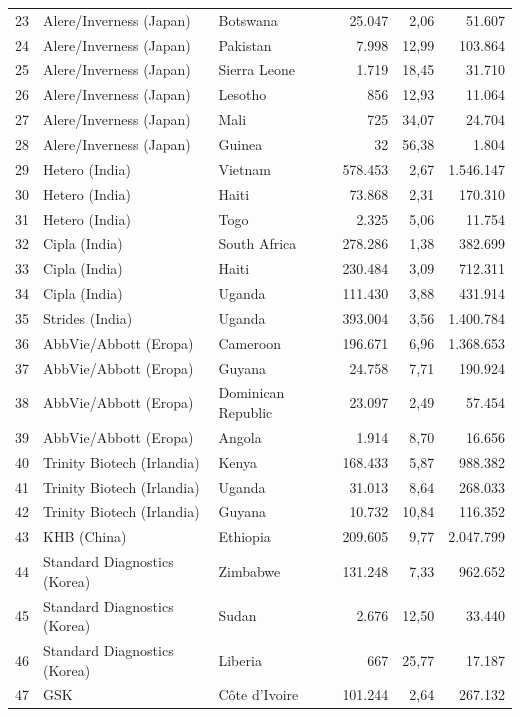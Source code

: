 \begin{longtable}{rllrrr}
23 & Alere/Inverness (Japan) & Botswana & 25.047 & 2,06 & 51.607 \\
24 & Alere/Inverness (Japan) & Pakistan & 7.998 & 12,99 & 103.864 \\
25 & Alere/Inverness (Japan) & Sierra Leone & 1.719 & 18,45 & 31.710 \\
26 & Alere/Inverness (Japan) & Lesotho & 856 & 12,93 & 11.064 \\
27 & Alere/Inverness (Japan) & Mali & 725 & 34,07 & 24.704 \\
28 & Alere/Inverness (Japan) & Guinea & 32 & 56,38 & 1.804 \\
29 & Hetero (India) & Vietnam & 578.453 & 2,67 & 1.546.147 \\
30 & Hetero (India) & Haiti & 73.868 & 2,31 & 170.310 \\
31 & Hetero (India) & Togo & 2.325 & 5,06 & 11.754 \\
32 & Cipla (India) & South Africa & 278.286 & 1,38 & 382.699 \\
33 & Cipla (India) & Haiti & 230.484 & 3,09 & 712.311 \\
34 & Cipla (India) & Uganda & 111.430 & 3,88 & 431.914 \\
35 & Strides (India) & Uganda & 393.004 & 3,56 & 1.400.784 \\
36 & AbbVie/Abbott (Eropa) & Cameroon & 196.671 & 6,96 & 1.368.653 \\
37 & AbbVie/Abbott (Eropa) & Guyana & 24.758 & 7,71 & 190.924 \\
38 & AbbVie/Abbott (Eropa) & Dominican Republic & 23.097 & 2,49 & 57.454 \\
39 & AbbVie/Abbott (Eropa) & Angola & 1.914 & 8,70 & 16.656 \\
40 & Trinity Biotech (Irlandia) & Kenya & 168.433 & 5,87 & 988.382 \\
41 & Trinity Biotech (Irlandia) & Uganda & 31.013 & 8,64 & 268.033 \\
42 & Trinity Biotech (Irlandia) & Guyana & 10.732 & 10,84 & 116.352 \\
43 & KHB (China) & Ethiopia & 209.605 & 9,77 & 2.047.799 \\
44 & Standard Diagnostics (Korea) & Zimbabwe & 131.248 & 7,33 & 962.652 \\
45 & Standard Diagnostics (Korea) & Sudan & 2.676 & 12,50 & 33.440 \\
46 & Standard Diagnostics (Korea) & Liberia & 667 & 25,77 & 17.187 \\
47 & GSK & Côte d'Ivoire & 101.244 & 2,64 & 267.132 \\

\end{longtable}
